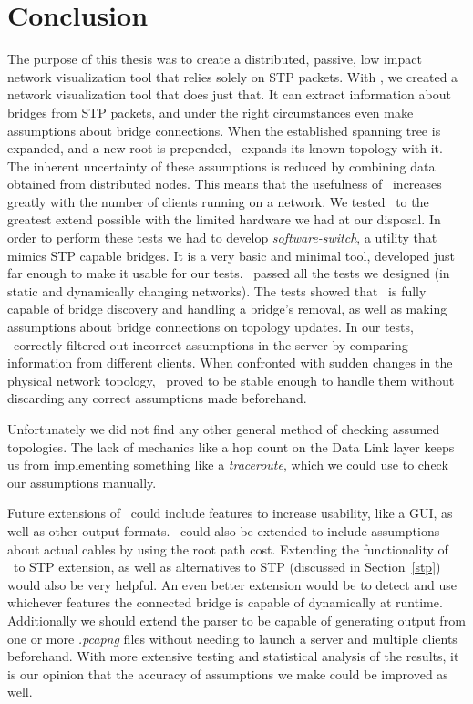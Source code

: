 \chapter{Conclusion}
\label{conclusion}
The purpose of this thesis was to create a distributed, passive, low impact network visualization tool that relies solely on STP packets.
With \tool, we created a network visualization tool that does just that.
It can extract information about bridges from STP packets, and under the right circumstances even make assumptions about bridge connections.
When the established spanning tree is expanded, and a new root is prepended, \tool\ expands its known topology with it.
The inherent uncertainty of these assumptions is reduced by combining data obtained from distributed nodes.
This means that the usefulness of \tool\ increases greatly with the number of clients running on a network.
We tested \tool\ to the greatest extend possible with the limited hardware we had at our disposal.
In order to perform these tests we had to develop \textit{software-switch}, a utility that mimics STP capable bridges.
It is a very basic and minimal tool, developed just far enough to make it usable for our tests.
\tool\ passed all the tests we designed (in static and dynamically changing networks).
The tests showed that \tool\ is fully capable of bridge discovery and handling a bridge's removal, as well as making assumptions about bridge connections on topology updates.
In our tests, \tool\ correctly filtered out incorrect assumptions in the server by comparing information from different clients.
When confronted with sudden changes in the physical network topology, \tool\ proved to be stable enough to handle them without discarding any correct assumptions made beforehand.

Unfortunately we did not find any other general method of checking assumed topologies.
The lack of mechanics like a hop count on the Data Link layer keeps us from implementing something like a \textit{traceroute}, which we could use to check our assumptions manually.

Future extensions of \tool\ could include features to increase usability, like a GUI, as well as other output formats.
\tool\ could also be extended to include assumptions about actual cables by using the root path cost.
Extending the functionality of \tool\ to STP extension, as well as alternatives to STP (discussed in Section~\ref{stp}) would also be very helpful.
An even better extension would be to detect and use whichever features the connected bridge is capable of dynamically at runtime.
Additionally we should extend the parser to be capable of generating output from one or more \textit{.pcapng} files without needing to launch a server and multiple clients beforehand.
With more extensive testing and statistical analysis of the results, it is our opinion that the accuracy of assumptions we make could be improved as well.


